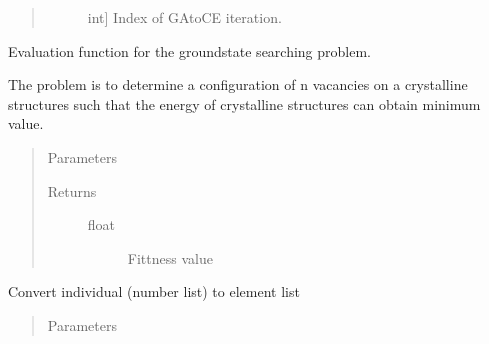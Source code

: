 \documentclass[letterpaper,10pt,english]{sphinxmanual}
\begin{document}
\begin{fulllineitems}
\begin{quote}
\begin{description}
\begin{description}
\item[{}] \leavevmode{[}int{]}
\sphinxAtStartPar
Index of GA\sphinxhyphen{}to\sphinxhyphen{}CE iteration.

\end{description}

\end{description}\end{quote}

\begin{fulllineitems}
\label{\detokenize{pygace:pygace.general_gace.GeneralApp.evalEnergy}}
\sphinxAtStartPar
Evaluation function for the ground\sphinxhyphen{}state searching problem.

\sphinxAtStartPar
The problem is to determine a configuration of n vacancies
on a crystalline structures such that the energy of crystalline
structures can obtain minimum value.
\begin{quote}\begin{description}
\item[{Parameters}] \leavevmode\begin{description}
\item[{}] \leavevmode
\end{description}

\item[{Returns}] \leavevmode\begin{description}
\item[{float}] \leavevmode
\sphinxAtStartPar
Fittness value

\end{description}

\end{description}\end{quote}

\end{fulllineitems}


\begin{fulllineitems}
\label{\detokenize{pygace:pygace.general_gace.GeneralApp.ind_to_elis}}
\sphinxAtStartPar
Convert individual (number list) to element list
\begin{quote}\begin{description}
\item[{Parameters}] \leavevmode\begin{description}
\item[{}] \leavevmode
\end{description}


\end{description}
\end{quote}
\end{fulllineitems}
\end{fulllineitems}
\end{document}
